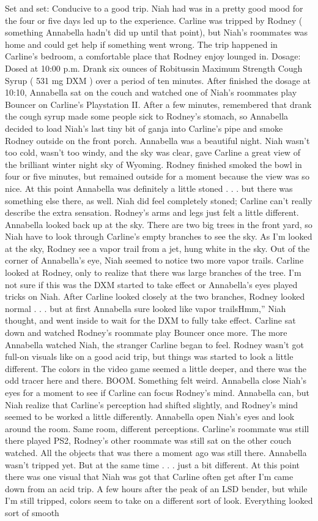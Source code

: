 \documentclass[12pt]{book}
\begin{document}
Set and set: Conducive to a good trip. Niah had was in a pretty good mood for the four or five days led up to the experience. Carline was tripped by Rodney ( something Annabella hadn't did up until that point), but Niah's roommates was home and could get help if something went wrong. The trip happened in Carline's bedroom, a comfortable place that Rodney enjoy lounged in. Dosage: Dosed at 10:00 p.m. Drank six ounces of Robitussin Maximum Strength Cough Syrup ( 531 mg DXM ) over a period of ten minutes. After finished the dosage at 10:10, Annabella sat on the couch and watched one of Niah's roommates play Bouncer on Carline's Playstation II. After a few minutes, remembered that drank the cough syrup made some people sick to Rodney's stomach, so Annabella decided to load Niah's last tiny bit of ganja into Carline's pipe and smoke Rodney outside on the front porch. Annabella was a beautiful night. Niah wasn't too cold, wasn't too windy, and the sky was clear, gave Carline a great view of the brilliant winter night sky of Wyoming. Rodney finished smoked the bowl in four or five minutes, but remained outside for a moment because the view was so nice. At this point Annabella was definitely a little stoned . . .  but there was something else there, as well. Niah did feel completely stoned; Carline can't really describe the extra sensation. Rodney's arms and legs just felt a little different. Annabella looked back up at the sky. There are two big trees in the front yard, so Niah have to look through Carline's empty branches to see the sky. As I'm looked at the sky, Rodney see a vapor trail from a jet, hung white in the sky. Out of the corner of Annabella's eye, Niah seemed to notice two more vapor trails. Carline looked at Rodney, only to realize that there was large branches of the tree. I'm not sure if this was the DXM started to take effect or Annabella's eyes played tricks on Niah. After Carline looked closely at the two branches, Rodney looked normal . . .  but at first Annabella sure looked like vapor trailsHmm,'' Niah thought, and went inside to wait for the DXM to fully take effect. Carline sat down and watched Rodney's roommate play Bouncer once more. The more Annabella watched Niah, the stranger Carline began to feel. Rodney wasn't got full-on visuals like on a good acid trip, but things was started to look a little different. The colors in the video game seemed a little deeper, and there was the odd tracer here and there. BOOM. Something felt weird. Annabella close Niah's eyes for a moment to see if Carline can focus Rodney's mind. Annabella can, but Niah realize that Carline's perception had shifted slightly, and Rodney's mind seemed to be worked a little differently. Annabella open Niah's eyes and look around the room. Same room, different perceptions. Carline's roommate was still there played PS2, Rodney's other roommate was still sat on the other couch watched. All the objects that was there a moment ago was still there. Annabella wasn't tripped yet. But at the same time . . .  just a bit different. At this point there was one visual that Niah was got that Carline often get after I'm came down from an acid trip. A few hours after the peak of an LSD bender, but while I'm still tripped, colors seem to take on a different sort of look. Everything looked sort of smooth 
\end{document}
